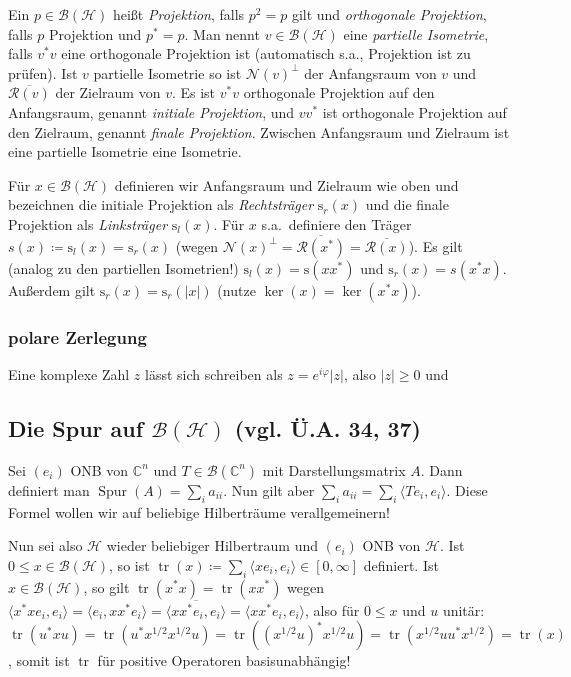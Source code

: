 \documentclass[11pt,a4paper]{scrartcl}
\newcommand{\C}{\mathbb{C}} %
\newcommand{\Hc}{\mathcal{H}}
\newcommand{\B}{\mathcal{B}}
\newcommand{\Nc}{\mathcal{N}}
\newcommand{\Rc}{\mathcal{R}}
\theoremstyle{plain}
\theoremstyle{definition}
\theoremstyle{remark}
\DeclareMathOperator{\Spur}{Spur}
\DeclareMathOperator{\tr}{tr}
\begin{document}
Ein $p\in \B(\Hc)$ heißt \emph{Projektion}, falls $p^2=p$ gilt und \emph{orthogonale Projektion}, falls $p$ Projektion und $p^*=p$. Man nennt $v\in \B(\Hc)$ eine \emph{partielle Isometrie}, falls $v^*v$ eine orthogonale Projektion ist (automatisch s.a., Projektion ist zu prüfen). Ist $v$ partielle Isometrie so ist $\Nc(v)^\perp$ der Anfangsraum von $v$ und $\overline{\Rc(v)}$ der Zielraum von $v$. Es ist $v^*v$ orthogonale Projektion auf den Anfangsraum, genannt \emph{initiale Projektion}, und $vv^*$ ist orthogonale Projektion auf den Zielraum, genannt \emph{finale Projektion}. Zwischen Anfangsraum und Zielraum ist eine partielle Isometrie eine Isometrie.

Für $x\in \B(\Hc)$ definieren wir Anfangsraum und Zielraum wie oben und bezeichnen die initiale Projektion als \emph{Rechtsträger} $\mathrm{s}_r(x)$ und die finale Projektion als \emph{Linksträger} $\mathrm{s}_l(x)$. Für $x$ s.a.\ definiere den Träger $s(x)\coloneqq \mathrm{s}_l(x)=\mathrm{s}_r(x)$ (wegen $\Nc(x)^\perp=\overline{\Rc(x^*)}=\overline{\Rc(x)}$). Es gilt (analog zu den partiellen Isometrien!) $\mathrm{s}_l(x)=\mathrm{s}(xx^*)$ und $\mathrm{s}_r(x)=s(x^*x)$. Außerdem gilt $\mathrm{s}_r(x)=\mathrm{s}_r(|x|)$ (nutze $\ker(x)=\ker(x^*x)$).

\subsubsection{polare Zerlegung}

Eine komplexe Zahl $z$ lässt sich schreiben als $z=e^{i\varphi}|z|$, also $|z| \geq 0$ und


\subsection{Die Spur auf $\B(\Hc)$ (vgl. Ü.A. 34, 37)}

Sei $(e_i)$ ONB von $\C^n$ und $T\in \B(\C^n)$ mit Darstellungsmatrix $A$. Dann definiert man $\Spur(A)=\sum_i a_{ii}$. Nun gilt aber $\sum_i a_{ii} = \sum_i \langle Te_i, e_i \rangle$. Diese Formel wollen wir auf beliebige Hilberträume verallgemeinern!

Nun sei also $\Hc$ wieder beliebiger Hilbertraum und $(e_i)$ ONB von $\Hc$. Ist $0\leq x\in \B(\Hc)$, so ist $\tr(x)\coloneqq \sum_i \langle x e_i, e_i \rangle \in [0,\infty]$ definiert. Ist $x\in \B(\Hc)$, so gilt $\tr(x^*x)=\tr(xx^*)$ wegen $\langle x^*x e_i, e_i \rangle = \langle e_i, xx^* e_i \rangle = \overline{\langle xx^* e_i, e_i \rangle} = \langle xx^* e_i, e_i \rangle$, also für $0 \leq x$ und $u$ unitär: $\tr(u^*xu)=\tr(u^*x^{1/2}x^{1/2}u)=\tr((x^{1/2}u)^*x^{1/2}u)=\tr(x^{1/2}uu^*x^{1/2})=\tr(x)$, somit ist $\tr$ für positive Operatoren basisunabhängig!
\end{document}
